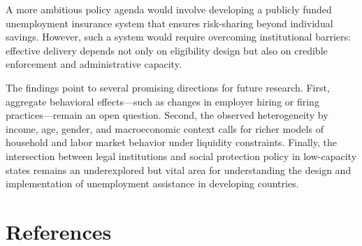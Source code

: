 \documentclass[
  4pt,
]{report}
\begin{document}
A more ambitious policy agenda would involve developing a publicly
funded unemployment insurance system that ensures risk-sharing beyond
individual savings. However, such a system would require overcoming
institutional barriers: effective delivery depends not only on
eligibility design but also on credible enforcement and administrative
capacity.

The findings point to several promising directions for future research.
First, aggregate behavioral effects---such as changes in employer hiring
or firing practices---remain an open question. Second, the observed
heterogeneity by income, age, gender, and macroeconomic context calls
for richer models of household and labor market behavior under liquidity
constraints. Finally, the intersection between legal institutions and
social protection policy in low-capacity states remains an underexplored
but vital area for understanding the design and implementation of
unemployment assistance in developing countries.

\chapter*{References}\label{references}
\end{document}
